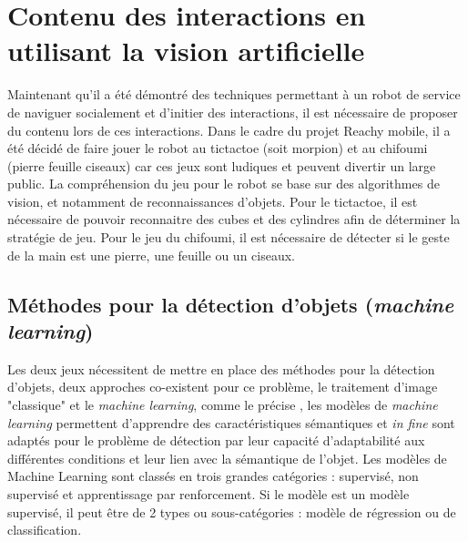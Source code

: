 \section[Vision]{Contenu des interactions en utilisant la vision artificielle}
    Maintenant qu'il a été démontré des techniques permettant à un robot de service de naviguer socialement et d'initier des interactions, il est nécessaire de proposer du contenu lors de ces interactions. 
    Dans le cadre du projet Reachy mobile, il a été décidé de faire jouer le robot au tictactoe (soit morpion) et au chifoumi (pierre feuille ciseaux) car ces jeux sont ludiques et peuvent divertir un large public. La compréhension du jeu pour le robot se base sur des algorithmes de vision, et notamment de reconnaissances d'objets. Pour le tictactoe, il est nécessaire de pouvoir reconnaitre des cubes et des cylindres afin de déterminer la stratégie de jeu. Pour le jeu du chifoumi, il est nécessaire de détecter si le geste de la main est une pierre, une feuille ou un ciseaux. 
    
    
\subsection{Méthodes pour la détection d'objets (\textit{machine learning})}

    Les deux jeux nécessitent de mettre en place des méthodes pour la détection d'objets, deux approches co-existent pour ce problème, le traitement d'image "classique" et le \textit{machine learning}, comme le précise \cite{zhao_object_2019}, les modèles de \textit{machine learning} permettent d'apprendre des caractéristiques sémantiques et \textit{in fine} sont adaptés pour le problème de détection par leur capacité d'adaptabilité aux différentes conditions et leur lien avec la sémantique de l'objet. Les modèles de Machine Learning sont classés en trois grandes catégories : supervisé, non supervisé et apprentissage par renforcement. Si le modèle est un modèle supervisé, il peut être de 2 types ou sous-catégories : modèle de régression ou de classification.
    
